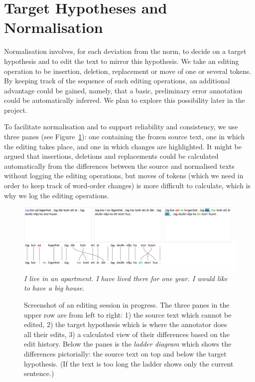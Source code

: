 \documentclass[10pt, a4paper]{article}
\begin{document}
\section{Target Hypotheses and Normalisation}

Normalisation involves, for each deviation from the norm, to decide on a target hypothesis and to edit the text to mirror this hypothesis. We take an editing operation to be insertion, deletion, replacement or move of one or several tokens. By keeping track of the sequence of such editing operations, an additional advantage could be gained, namely, that a basic, preliminary error annotation could be automatically inferred. We plan to explore this possibility later in the project.

To facilitate normalisation and to support reliability and consistency,
we use three panes (see Figure~\ref{fig:screenshot}): one containing the
frozen source text, one in which the editing takes place, and one in which
changes are highlighted. It might be argued that insertions, deletions and
replacements could be calculated automatically from the differences between
the source and normalised texts without logging the editing operations, but
moves of tokens (which we need in order to keep track of word-order changes)
is more difficult to calculate, which is why we log the editing operations.

\begin{figure}
\includegraphics[width=\textwidth, trim={0 1cm 0 0}, clip]{screenshot.pdf}
\emph{\small I live in an apartment. I have lived there for one year. I would like to have a big house.}
\caption{Screenshot of an editing session in progress. The three panes in the upper row are from left to right:
1) the source text which cannot be edited,
2) the target hypothesis which is where the annotator does all their edits,
3) a calculated view of their differences based on the edit history.
Below the panes is the \emph{ladder diagram} which shows the differences
pictorially: the source text on top and below the target hypothesis.
(If the text is too long the ladder shows only the current sentence.)
\label{fig:screenshot}
}
\end{figure}
\end{document}
